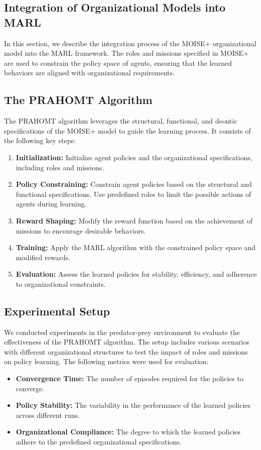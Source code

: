 \documentclass[sigconf,anonymous]{aamas}
\begin{document}
\subsection{Integration of Organizational Models into MARL}
In this section, we describe the integration process of the MOISE+ organizational model into the MARL framework. The roles and missions specified in MOISE+ are used to constrain the policy space of agents, ensuring that the learned behaviors are aligned with organizational requirements.

\subsection{The PRAHOMT Algorithm}
\label{subsec:prahomt_algorithm}
The PRAHOMT algorithm leverages the structural, functional, and deontic specifications of the MOISE+ model to guide the learning process. It consists of the following key steps:
\begin{enumerate}
    \item \textbf{Initialization:} Initialize agent policies and the organizational specifications, including roles and missions.
    \item \textbf{Policy Constraining:} Constrain agent policies based on the structural and functional specifications. Use predefined roles to limit the possible actions of agents during learning.
    \item \textbf{Reward Shaping:} Modify the reward function based on the achievement of missions to encourage desirable behaviors.
    \item \textbf{Training:} Apply the MARL algorithm with the constrained policy space and modified rewards.
    \item \textbf{Evaluation:} Assess the learned policies for stability, efficiency, and adherence to organizational constraints.
\end{enumerate}

\subsection{Experimental Setup}
\label{subsec:experimental_setup}
We conducted experiments in the predator-prey environment to evaluate the effectiveness of the PRAHOMT algorithm. The setup includes various scenarios with different organizational structures to test the impact of roles and missions on policy learning. The following metrics were used for evaluation:
\begin{itemize}
    \item \textbf{Convergence Time:} The number of episodes required for the policies to converge.
    \item \textbf{Policy Stability:} The variability in the performance of the learned policies across different runs.
    \item \textbf{Organizational Compliance:} The degree to which the learned policies adhere to the predefined organizational specifications.
\end{itemize}
\end{document}

